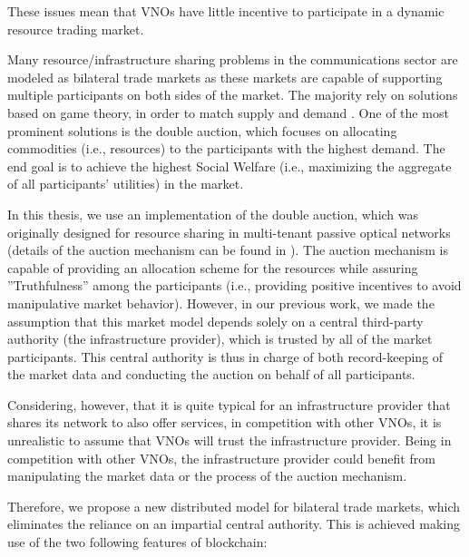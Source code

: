 These issues mean that \acp{VNO} have little incentive to participate in a dynamic resource trading market.



Many resource/infrastructure sharing problems in the communications sector are modeled as bilateral trade markets as these markets are capable of supporting multiple participants on both sides of the market. The majority rely on solutions based on game theory, in order to match supply and demand \cite{8542782,8665886,8664672,8395445,8488596}. One of the most prominent solutions is the double auction, which focuses on allocating commodities (i.e., resources) to the participants with the highest demand. The end goal is to achieve the highest Social Welfare (i.e., maximizing the aggregate of all participants' utilities) in the market. 

In this thesis, we use an implementation of the double auction, which was originally designed for resource sharing in multi-tenant passive optical networks (details of the auction mechanism can be found in \cite{8488596}). The auction mechanism is capable of providing an allocation scheme for the resources while assuring ''Truthfulness'' among the participants (i.e., providing positive incentives to avoid manipulative market behavior). However, in our previous work, we made the assumption that this market model depends solely on a central third-party authority (the infrastructure provider), which is trusted by all of the market participants. This central authority is thus in charge of both record-keeping of the market data and conducting the auction on behalf of all participants. 

Considering, however, that it is quite typical for an infrastructure provider that shares its network to also offer services, in competition with other \acp{VNO}, it is unrealistic to assume that \acp{VNO} will trust the infrastructure provider. Being in competition with other \acp{VNO}, the infrastructure provider could benefit from manipulating the market data or the process of the auction mechanism. 

Therefore, we propose a new distributed model for bilateral trade markets, which eliminates the reliance on an impartial central authority. This is achieved making use of the two following features of blockchain:

